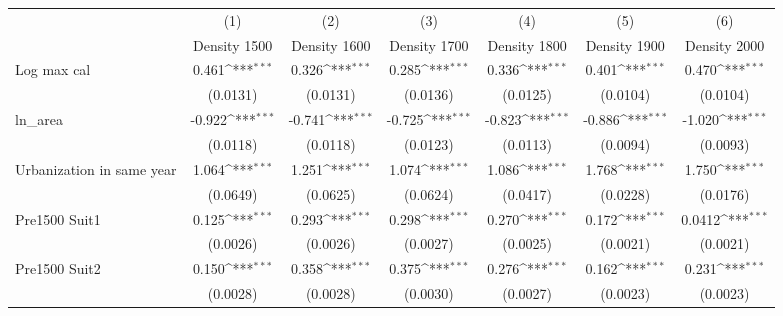 {
\def\sym#1{\ifmmode^{#1}\else\(^{#1}\)\fi}
\begin{tabular}{l*{6}{c}}
\toprule
                    &\multicolumn{1}{c}{(1)}&\multicolumn{1}{c}{(2)}&\multicolumn{1}{c}{(3)}&\multicolumn{1}{c}{(4)}&\multicolumn{1}{c}{(5)}&\multicolumn{1}{c}{(6)}\\
                    &\multicolumn{1}{c}{Density 1500}&\multicolumn{1}{c}{Density 1600}&\multicolumn{1}{c}{Density 1700}&\multicolumn{1}{c}{Density 1800}&\multicolumn{1}{c}{Density 1900}&\multicolumn{1}{c}{Density 2000}\\
\midrule
Log max cal         &       0.461\sym{***}&       0.326\sym{***}&       0.285\sym{***}&       0.336\sym{***}&       0.401\sym{***}&       0.470\sym{***}\\
                    &    (0.0131)         &    (0.0131)         &    (0.0136)         &    (0.0125)         &    (0.0104)         &    (0.0104)         \\
\addlinespace
ln\_area             &      -0.922\sym{***}&      -0.741\sym{***}&      -0.725\sym{***}&      -0.823\sym{***}&      -0.886\sym{***}&      -1.020\sym{***}\\
                    &    (0.0118)         &    (0.0118)         &    (0.0123)         &    (0.0113)         &    (0.0094)         &    (0.0093)         \\
\addlinespace
Urbanization in same year&       1.064\sym{***}&       1.251\sym{***}&       1.074\sym{***}&       1.086\sym{***}&       1.768\sym{***}&       1.750\sym{***}\\
                    &    (0.0649)         &    (0.0625)         &    (0.0624)         &    (0.0417)         &    (0.0228)         &    (0.0176)         \\
\addlinespace
Pre1500 Suit1       &       0.125\sym{***}&       0.293\sym{***}&       0.298\sym{***}&       0.270\sym{***}&       0.172\sym{***}&      0.0412\sym{***}\\
                    &    (0.0026)         &    (0.0026)         &    (0.0027)         &    (0.0025)         &    (0.0021)         &    (0.0021)         \\
\addlinespace
Pre1500 Suit2       &       0.150\sym{***}&       0.358\sym{***}&       0.375\sym{***}&       0.276\sym{***}&       0.162\sym{***}&       0.231\sym{***}\\
                    &    (0.0028)         &    (0.0028)         &    (0.0030)         &    (0.0027)         &    (0.0023)         &    (0.0023)         \\

\end{tabular}}
